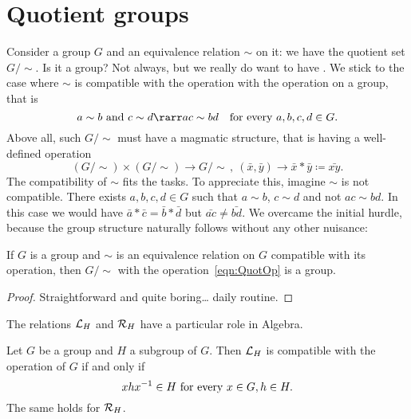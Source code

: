 
\section{Quotient groups}

Consider a group \(G\) and an equivalence relation \(\sim\) on it: we have the quotient set \(G/\sim\). Is it a group? Not always, but we really do want to have . We stick to the case where \(\sim\) is compatible with the operation with the operation on a group, that is
\[a \sim b \text{ and } c \sim d \rarr ac \sim bd \quad \text{for every } a, b, c, d \in G.\]
Above all, such \(G/\sim\) must have a magmatic structure, that is having a well-defined operation
\begin{equation}(G/\sim) \times (G/\sim) \to G/\sim\,, \ (\bar x, \bar y) \to \bar x \ast \bar y \coloneq \bar{xy}.\label{eqn:QuotOp}
\end{equation}
The compatibility of \(\sim\) fits the tasks. To appreciate this, imagine \(\sim\) is not compatible. There exists \(a, b, c, d \in G\) such that \(a \sim b\), \(c \sim d\) and not \(ac \sim bd\). In this case we would have \(\bar a \ast \bar c = \bar b \ast \bar d\) but \(\bar{ac} \ne \bar{bd}\).\newline
We overcame the initial hurdle, because the group structure naturally follows without any other nuisance:

\begin{proposition}\label{prop:QuotientGroupEquivRel}
If \(G\) is a group and \(\sim\) is an equivalence relation on \(G\) compatible with its operation, then \(G/\sim\) with the operation~\eqref{eqn:QuotOp} is a group.
\end{proposition}

\begin{proof}
Straightforward and quite boring\dots{} daily routine.
\end{proof}

The relations \(\mathcal L_H\) and \(\mathcal R_H\) have a particular role in Algebra.

\begin{proposition}\label{prop:LRCompatible}
Let \(G\) be a group and \(H\) a subgroup of \(G\). Then \(\mathcal L_H\) is compatible with the operation of \(G\) if and only if 
\begin{equation}
xhx^{-1} \in H \text{ for every } x \in G, h \in H .\label{eqn:NormalSubGrp}
\end{equation}
The same holds for \(\mathcal R_H\).
\end{proposition}

